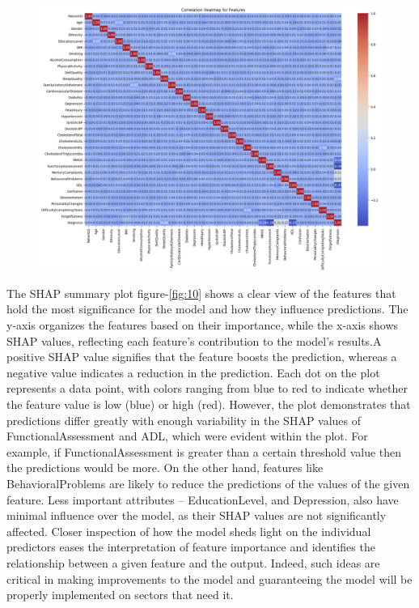 \documentclass[conference]{IEEEtran} %
\begin{document}
\begin{figure}[ht]
    \centering
    \includegraphics[width=\linewidth]{Fig-07.png}
    \caption{}
    \label{fig:heatmap}
\end{figure}
\FloatBarrier

The SHAP summary plot figure-\ref{fig:10} shows a clear view of the features that hold the most significance for the model and how they influence predictions. The y-axis organizes the features based on their importance, while the x-axis shows SHAP values, reflecting each feature's contribution to the model's results.A positive SHAP value signifies that the feature boosts the prediction, whereas a negative value indicates a reduction in the prediction. Each dot on the plot represents a data point, with colors ranging from blue to red to indicate whether the feature value is low (blue) or high (red). However, the plot demonstrates that predictions differ greatly with enough variability in the SHAP values of FunctionalAssessment and ADL, which were evident within the plot. For example, if FunctionalAssessment is greater than a certain threshold value then the predictions would be more. On the other hand, features like BehavioralProblems are likely to reduce the predictions of the values of the given feature. Less important attributes – EducationLevel, and Depression, also have minimal influence over the model, as their SHAP values are not significantly affected.  Closer inspection of how the model sheds light on the individual predictors eases the interpretation of feature importance and identifies the relationship between a given feature and the output. Indeed, such ideas are critical in making improvements to the model and guaranteeing the model will be properly implemented on sectors that need it.
\end{document}
